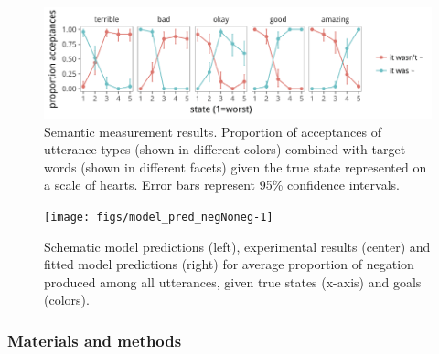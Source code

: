 \documentclass[10pt, letterpaper]{article}
\newenvironment{CodeChunk}{}{}
\begin{document}
\begin{CodeChunk}
\begin{figure}[t]

{\centering \includegraphics{figs/expt1_results-1} 

}

\caption[Semantic measurement results]{Semantic measurement results. Proportion of acceptances of utterance types (shown in different colors) combined with target words (shown in different facets) given the true state represented on a scale of hearts. Error bars represent 95\% confidence intervals.}\label{fig:expt1_results}
\end{figure}
\end{CodeChunk}

\begin{CodeChunk}
\begin{figure}[t]

{\centering \texttt{[image: figs/model\_pred\_negNoneg-1]} 

}

\caption[Schematic model predictions (left), experimental results (center) and fitted model predictions (right) for average proportion of negation produced among all utterances, given true states (x-axis) and goals (colors)]{Schematic model predictions (left), experimental results (center) and fitted model predictions (right) for average proportion of negation produced among all utterances, given true states (x-axis) and goals (colors).}\label{fig:model_pred_negNoneg}
\end{figure}
\end{CodeChunk}

\subsubsection{Materials and methods}\label{materials-and-methods}
\end{document}
